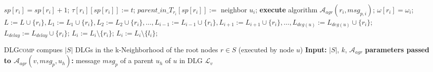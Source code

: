 \documentclass[11pt]{article}
\newcommand{\calL}{\mathcal{L}}
\begin{document}
\begin{algorithm}[tp]
\begin{algorithmic}[1]
                         \label{line:treevarstart}
                                                 \label{line:kvarstart}
                                                        \STATE $sp[r_i]=sp[r_i]+1$;
                                                        \STATE $\tau[r_i][sp[r_i]]:=t$;\label{line:tau}
                                                        \STATE $parent\_in\_T_{r_i}[sp[r_i]]:=$ neighbor $u_i$; \label{line:tauplusone}
                                                        \STATE \textbf{execute} algorithm ${\mathcal{A}}_{agr}(r_i, msg_{p,i})$; \label{line:exf}
                                                \ENDIF
                                                        \STATE $\omega[r_i]=\omega_i$; \label{line:omegacomp}
                                                        \STATE $L:=L\cup\{r_i\}, L_1:=L_1\cup\{r_i\}, L_2:=L_2\cup\{r_i\},\dots,L_{i-1}:=L_{i-1}\cup\{r_i\},L_{i+1}:=L_{i+1}\cup\{r_i\},\dots,L_{deg(u)}:=L_{deg(u)}\cup\{r_i\}$;
                                                                \STATE $L_{delay}:=L_{delay}\cup\{r_i\}$; \label{line:DLGputLdelay}
                                                        \ENDIF
                                                \ELSE
                                                        \STATE $L_i:=L_i\setminus \{r_i\}$;
                                                \ENDIF
                                        \ENDIF \label{line:treevarend}        
                \ELSE
                        \STATE $L_i:=L_i\setminus \{l_i\}$; 
                \ENDIF
        \ENDFOR
\ENDFOR
\end{algorithmic}
\caption{\textsc{DLGcomp} compues $|S|$ DLGs in the k-Neighborhood of the root nodes $r\in S$ \newline
(executed by node $u$) \newline 
        \textbf{Input:} $|S|$, $k$, ${\mathcal{A}}_{agr}$\newline 
        \textbf{parameters passed to ${\mathcal{A}}_{agr}(v, msg_p, u_h)$:} message $msg_p$ of a parent $u_h$ of $u$ in DLG $\calL_v$}
\label{alg:DLGcomp}
\end{algorithm}
\fi
\end{document}

